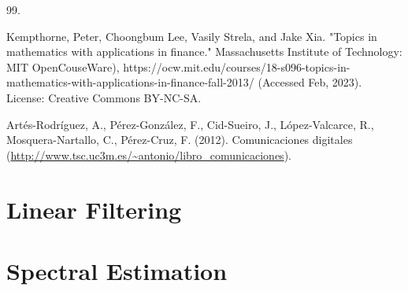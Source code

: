 \documentclass[graybox,envcountchap,sectrefs]{svmono_mod}
\begin{document}
\begin{thebibliography}{99.}

Kempthorne, Peter, Choongbum Lee, Vasily Strela, and Jake Xia. "Topics in mathematics with applications in finance." Massachusetts Institute of Technology: MIT OpenCouseWare), https://ocw.mit.edu/courses/18-s096-topics-in-mathematics-with-applications-in-finance-fall-2013/ (Accessed Feb, 2023). License: Creative Commons BY-NC-SA.

Artés-Rodríguez, A., Pérez-González, F., Cid-Sueiro, J., López-Valcarce, R., Mosquera-Nartallo, C., Pérez-Cruz, F. (2012). Comunicaciones digitales (\url{http://www.tsc.uc3m.es/~antonio/libro_comunicaciones}).

\end{thebibliography}


\chapter{Linear Filtering}
\label{cha:FiltradoLinea}

\localtableofcontents




\chapter{Spectral Estimation}

\localtableofcontents
% 



\backmatter
\printindex
\end{document}

